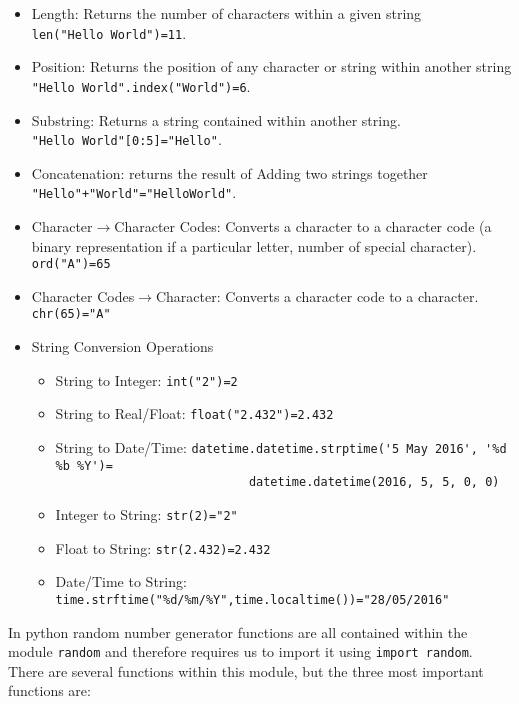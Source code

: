 \documentclass[a4paper]{article}
\begin{document}
			\begin{itemize}
				\setlength\itemsep{0em}
				\item Length: Returns the number of characters within a given string\\ 
				\verb|len("Hello World")=11|.
				\item Position: Returns the position of any character or string within another string \\
				\verb|"Hello World".index("World")=6|.
				\item Substring: Returns a string contained within another string.\\ 
				\verb|"Hello World"[0:5]="Hello"|.
				\item Concatenation: returns the result of Adding two strings together \\
				\verb|"Hello"+"World"="HelloWorld"|.
				\item Character$\to$Character Codes: Converts a character to a character code (a binary representation if a particular letter, number of special character).\\
				\verb|ord("A")=65|
				\item Character Codes$\to$Character: Converts a character code to a character.\\
				\verb|chr(65)="A"|
				\item String Conversion Operations
				\begin{itemize}
					\setlength\itemsep{0em}
					\item String to Integer:
						\subitem \verb|int("2")=2|
					\item String to Real/Float: 
						\subitem \verb|float("2.432")=2.432|
					\item String to Date/Time: 
						\subitem \verb|datetime.datetime.strptime('5 May 2016', '%d %b %Y')=|\\
\verb|                           datetime.datetime(2016, 5, 5, 0, 0)|
					\item Integer to String: 
						\subitem \verb|str(2)="2"|
					\item Float to String: 
						\subitem \verb|str(2.432)=2.432|
					\item Date/Time to String:
						\subitem \verb|time.strftime("%d/%m/%Y",time.localtime())="28/05/2016"|
				\end{itemize}
			\end{itemize}
			In python random number generator functions are all contained within the module \verb|random| and therefore requires us to import it using \verb|import random|. There are several functions within this module, but the three most important functions are:
\end{document}
